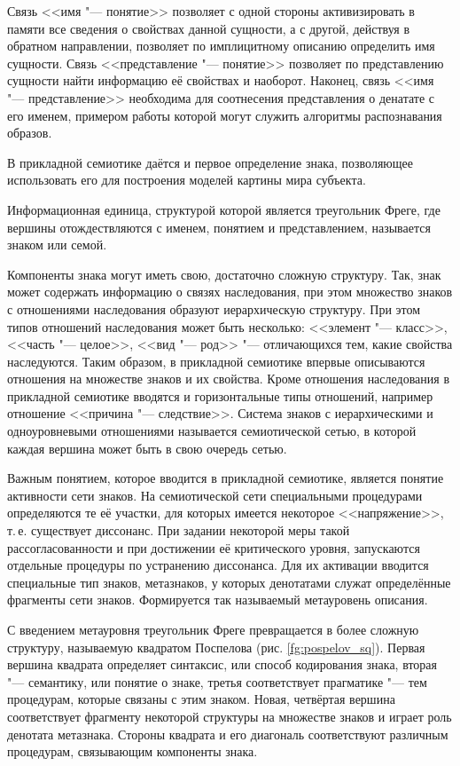 Связь <<имя "--- понятие>> позволяет с одной стороны активизировать в памяти все сведения о свойствах данной сущности, а с другой, действуя в обратном направлении, позволяет по имплицитному описанию определить имя сущности. Связь <<представление "--- понятие>> позволяет по представлению сущности найти информацию её свойствах и наоборот. Наконец, связь <<имя "--- представление>> необходима для соотнесения представления о денатате с его именем, примером работы которой могут служить алгоритмы распознавания образов.

В прикладной семиотике даётся и первое определение знака, позволяющее использовать его для построения моделей картины мира субъекта.

\begin{Def}
	Информационная единица, структурой которой является треугольник Фреге, где вершины отождествляются с именем, понятием и представлением, называется знаком или семой.
\end{Def}

Компоненты знака могут иметь свою, достаточно сложную структуру. Так, знак может содержать информацию о связях наследования, при этом множество знаков с отношениями наследования образуют иерархическую структуру. При этом типов отношений наследования может быть несколько: <<элемент "--- класс>>, <<часть "--- целое>>, <<вид "--- род>> "--- отличающихся тем, какие свойства наследуются. Таким образом, в прикладной семиотике впервые описываются отношения на множестве знаков и их свойства. Кроме отношения наследования в прикладной семиотике вводятся и горизонтальные типы отношений, например отношение <<причина "--- следствие>>. Система знаков с иерархическими и одноуровневыми отношениями называется семиотической сетью, в которой каждая вершина может быть в свою очередь сетью.

Важным понятием, которое вводится в прикладной семиотике, является понятие активности сети знаков. На семиотической сети специальными процедурами определяются те её участки, для которых имеется некоторое <<напряжение>>, т.\,е. существует диссонанс. При задании некоторой меры такой рассогласованности и при достижении её критического уровня, запускаются отдельные процедуры по устранению диссонанса. Для их активации вводится специальные тип знаков, метазнаков, у которых денотатами служат определённые фрагменты сети знаков. Формируется так называемый метауровень описания.

С введением метауровня треугольник Фреге превращается в более сложную структуру, называемую квадратом Поспелова \cite{Osipov2000b} (рис. \ref{fg:pospelov_sq}). Первая вершина квадрата определяет синтаксис, или способ кодирования знака, вторая  "--- семантику, или понятие о знаке, третья соответствует прагматике "--- тем процедурам, которые связаны с этим знаком. Новая, четвёртая вершина соответствует фрагменту некоторой структуры на множестве знаков и играет роль денотата метазнака. Стороны квадрата и его диагональ соответствуют различным процедурам, связывающим компоненты знака. 

